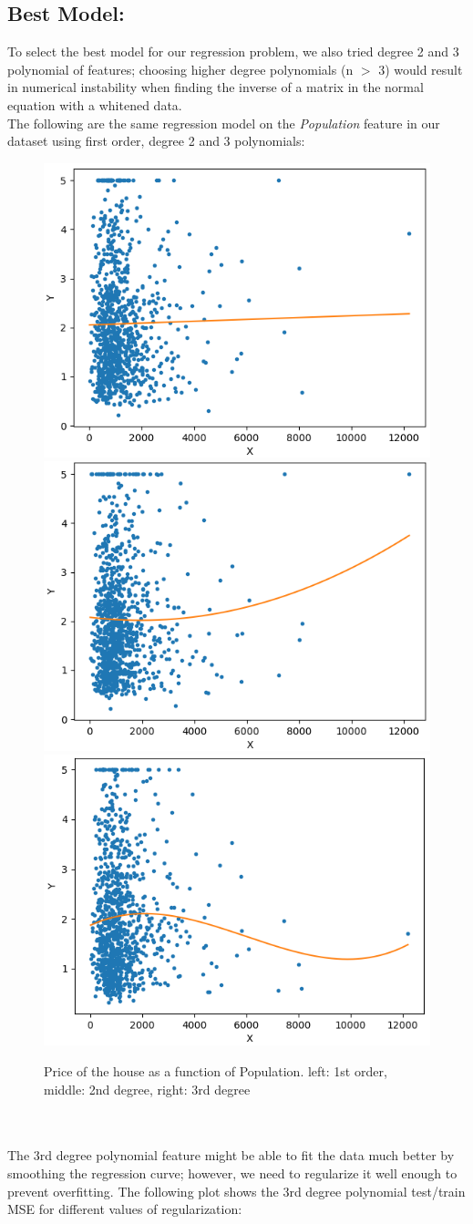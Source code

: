 \documentclass[a4paper,11pt]{article}
\begin{document}
\subsection{\large Best Model:}
To select the best model for our regression problem, we also tried degree 2 and 3 polynomial of features; choosing higher degree polynomials (n $>$ 3) would result in numerical instability when finding the inverse of a matrix in the normal equation with a whitened data. \\
The following are the same regression model on the \textit{Population} feature in our dataset using first order, degree 2 and 3 polynomials: 
\begin{figure}[!htb]
	\centering
	\includegraphics[width=.3\textwidth]{linear_d1.png}\hfill
	\includegraphics[width=.3\textwidth]{linear_d2.png}\hfill
	\includegraphics[width=.3\textwidth]{linear_d3.png}
	\caption{Price of the house as a function of Population. left: 1st order, middle: 2nd degree, right: 3rd degree}
\end{figure}
\\\\The 3rd degree polynomial feature might be able to fit the data much better by smoothing the regression curve; however, we need to regularize it well enough to prevent overfitting. The following plot shows the 3rd degree polynomial test/train MSE for different values of regularization:
\end{document}
